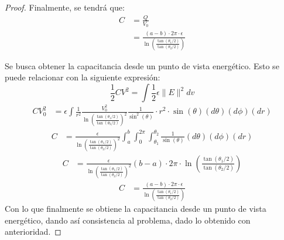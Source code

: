 \begin{proof}
    Finalmente, se tendrá que:
    \begin{equation}
        \begin{aligned}
            C &= \frac{Q}{V_{0}} \\
              &= \frac{(a-b)  \cdot 2\pi \cdot \epsilon}{\ln\left(\frac{\tan(\theta_{1}/2)}{\tan(\theta_{2}/2)}\right)}
        \end{aligned}
    \end{equation}
    \item Se busca obtener la capacitancia desde un punto de vista energético. Esto se puede relacionar con la siguiente expresión:
    \begin{equation}
        \frac{1}{2}C V^{2} = \int \frac{1}{2}\epsilon \|E\|^{2} dv
    \end{equation}
    \begin{equation}
        \begin{aligned}
            CV_{0}^{2} &= \epsilon \int \frac{1}{r^{2}}  \frac{V_{0}^{2}}{\ln\left(\frac{\tan(\theta_{1}/2)}{\tan(\theta_{2}/2)}\right)^{2}}\frac{1}{\sin^{2}(\theta)} \cdot r^{2} \cdot \sin(\theta) (d\theta) (d\phi) (dr)
        \end{aligned}
    \end{equation}
    \begin{equation}
        \begin{aligned}
            C &= \frac{\epsilon}{{\ln\left(\frac{\tan(\theta_{1}/2)}{\tan(\theta_{2}/2)}\right)^{2}}} \int_{a}^{b} \int_{0}^{2\pi} \int_{\theta_{1}}^{\theta_{2}}\frac{1}{\sin(\theta)} (d\theta) (d\phi) (dr)
        \end{aligned}
    \end{equation}
    \begin{equation}
        \begin{aligned}
            C &= \frac{\epsilon}{{\ln\left(\frac{\tan(\theta_{1}/2)}{\tan(\theta_{2}/2)}\right)^{2}}} (b-a) \cdot 2\pi \cdot \ln\left(\frac{\tan(\theta_{1}/2)}{\tan(\theta_{2}/2)}\right)
        \end{aligned}
    \end{equation}
    \begin{equation}
        \begin{aligned}
            C &=\frac{(a-b)  \cdot 2\pi \cdot \epsilon}{\ln\left(\frac{\tan(\theta_{1}/2)}{\tan(\theta_{2}/2)}\right)}
        \end{aligned}
    \end{equation}
    Con lo que finalmente se obtiene la capacitancia desde un punto de vista energético, dando así consistencia al problema, dado lo obtenido con anterioridad.             
\end{proof}
